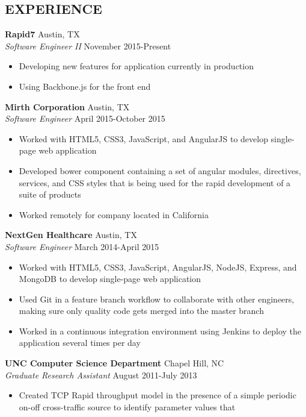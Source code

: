 \documentclass[line,margin,letterpaper]{res}
\begin{document}
\begin{resume}
\section{EXPERIENCE}
  {\bf Rapid7} \hfill Austin, TX \\
  \emph{Software Engineer II} \hfill November 2015-Present
  \begin{itemize} \itemsep -2pt
    \item Developing new features for application currently in production
    \item Using Backbone.js for the front end
  \end{itemize}
  {\bf Mirth Corporation} \hfill Austin, TX \\
  \emph{Software Engineer} \hfill April 2015-October 2015
  \begin{itemize} \itemsep -2pt
    \item Worked with HTML5, CSS3, JavaScript, and AngularJS to develop
    single-page web application
    \item Developed bower component containing a set of angular modules,
    directives, services, and CSS styles that is being used for the rapid
    development of a suite of products
    \item Worked remotely for company located in California
  \end{itemize}
  {\bf NextGen Healthcare} \hfill Austin, TX \\
  \emph{Software Engineer} \hfill March 2014-April 2015
  \begin{itemize} \itemsep -2pt
    \item Worked with HTML5, CSS3, JavaScript, AngularJS, NodeJS, Express, and
    MongoDB to develop single-page web application
    \item Used Git in a feature branch workflow to collaborate with other
    engineers, making sure only quality code gets merged into the master branch
    \item Worked in a continuous integration environment using Jenkins to
    deploy the application several times per day
  \end{itemize}
  {\bf UNC Computer Science Department} \hfill Chapel Hill, NC \\
  \emph{Graduate Research Assistant} \hfill August 2011-July 2013
  \begin{itemize} \itemsep -2pt
    \item Created TCP Rapid throughput model in the presence of a simple 
    periodic on-off cross-traffic source to identify parameter values that 

\end{itemize}
\end{resume}
\end{document}
